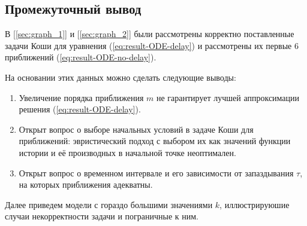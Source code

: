 \newpage

\subsection{Промежуточный вывод}

В [\ref{sec:graph_1}] и [\ref{sec:graph_2}] были рассмотрены корректно поставленные задачи Коши для уравнения (\ref{eq:result-ODE-delay}) и рассмотрены их первые $6$ приближений (\ref{eq:result-ODE-no-delay}).

На основании этих данных можно сделать следующие выводы:

\begin{enumerate}
    \item Увеличение порядка приближения $m$ не гарантирует лучшей аппроксимации решения (\ref{eq:result-ODE-delay}).
    \item Открыт вопрос о выборе начальных условий в задаче Коши для приближений: эвристический подход с выбором их как значений функции истории и её производных в начальной точке неоптимален.
    \item Открыт вопрос о временном интервале и его зависимости от запаздывания $\tau$, на которых приближения адекватны.
\end{enumerate}

Далее приведем модели с гораздо большими значениями $k$, иллюстрируюшие случаи некорректности задачи и пограничные к ним.